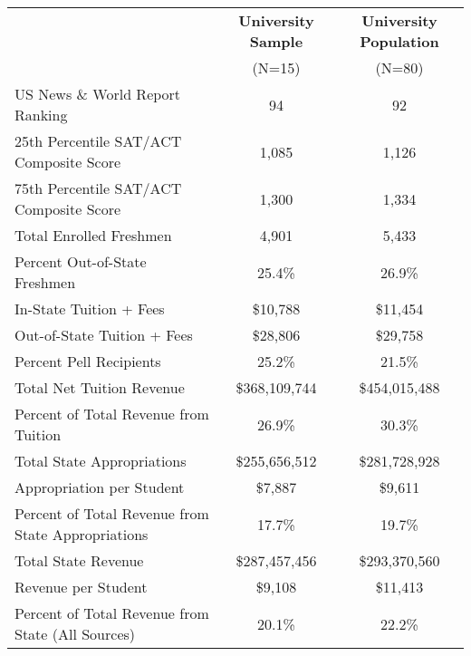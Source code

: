 \begin{tabular*}{\textwidth}{@{\extracolsep{\fill} } lcc}%
\textbf{}&\textbf{University Sample}&\textbf{University Population}\\%
&(N=15)&(N=80)\\%
\hline%
US News \& World Report Ranking&94&92\\%
25th Percentile SAT/ACT Composite Score&1,085&1,126\\%
75th Percentile SAT/ACT Composite Score&1,300&1,334\\%
Total Enrolled Freshmen&4,901&5,433\\%
Percent Out{-}of{-}State Freshmen&25.4\%&26.9\%\\%
In{-}State Tuition + Fees&\$10,788&\$11,454\\%
Out{-}of{-}State Tuition + Fees&\$28,806&\$29,758\\%
Percent Pell Recipients&25.2\%&21.5\%\\%
Total Net Tuition Revenue&\$368,109,744&\$454,015,488\\%
Percent of Total Revenue from Tuition&26.9\%&30.3\%\\%
Total State Appropriations&\$255,656,512&\$281,728,928\\%
Appropriation per Student&\$7,887&\$9,611\\%
Percent of Total Revenue from State Appropriations&17.7\%&19.7\%\\%
Total State Revenue&\$287,457,456&\$293,370,560\\%
Revenue per Student&\$9,108&\$11,413\\%
Percent of Total Revenue from State (All Sources)&20.1\%&22.2\%\\%
\hline%
\end{tabular*}